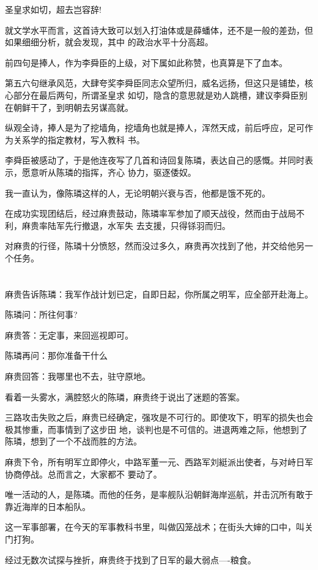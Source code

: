 \documentclass[11pt,a4paper,onecolumn]{article}
\begin{document}
圣皇求如切，超去岂容辞!

就文学水平而言，这首诗大致可以划入打油体或是薛蟠体，还不是一般的差劲，但如果细细分析，就会发现，其中
的政治水平十分高超。

前四句是捧人，作为李舜臣的上级，对下属如此称赞，也真算是下了血本。

第五六句继承风范，大肆夸奖李舜臣同志众望所归，威名远扬，但这只是铺垫，核心部分在最后两句，所谓圣皇求
如切，隐含的意思就是劝人跳槽，建议李舜臣别在朝鲜干了，到明朝去另谋高就。

纵观全诗，捧人是为了挖墙角，挖墙角也就是捧人，浑然天成，前后呼应，足可作为关系学的指定教材，写入教科
书。

李舜臣被感动了，于是他连夜写了几首和诗回复陈璘，表达自己的感慨。并同时表示，愿意听从陈璘的指挥，齐心
协力，驱逐倭奴。

我一直认为，像陈璘这样的人，无论明朝兴衰与否，他都是饿不死的。

在成功实现团结后，经过麻贵鼓动，陈璘率军参加了顺天战役，然而由于战局不利，麻贵率陆军先行撤退，水军失
去支援，只得铩羽而归。

对麻贵的行径，陈璘十分愤怒，然而没过多久，麻贵再次找到了他，并交给他另一个任务。

\section[\thesection]{}

麻贵告诉陈璘：我军作战计划已定，自即日起，你所属之明军，应全部开赴海上。

陈璘问：所往何事?

麻贵答：无定事，来回巡视即可。

陈璘再问：那你准备干什么

麻贵回答：我哪里也不去，驻守原地。

看着一头雾水，满腔怒火的陈璘，麻贵终于说出了迷题的答案。

三路攻击失败之后，麻贵已经确定，强攻是不可行的。即使攻下，明军的损失也会极其惨重，而事情到了这步田
地，谈判也是不可信的。进退两难之际，他想到了陈璘，想到了一个不战而胜的方法。

麻贵下令，所有明军立即停火，中路军董一元、西路军刘綎派出使者，与对峙日军协商停战。总而言之，大家都不
要动了。

唯一活动的人，是陈璘。而他的任务，是率舰队沿朝鲜海岸巡航，并击沉所有敢于靠近海岸的日本船队。

这一军事部署，在今天的军事教科书里，叫做囚笼战术；在街头大婶的口中，叫关门打狗。

经过无数次试探与挫折，麻贵终于找到了日军的最大弱点----粮食。
\end{document}
